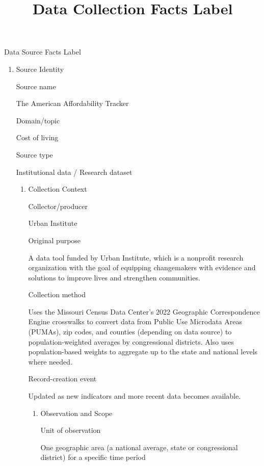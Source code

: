 \documentclass[
  letterpaper,
  DIV=11,
  numbers=noendperiod]{scrartcl}
\title{Data Collection Facts Label}
\author{}
\date{}
\providecommand{\tightlist}{%
  \setlength{\itemsep}{0pt}\setlength{\parskip}{0pt}}
\begin{document}
\maketitle


Data Source Facts Label

\begin{enumerate}
\def\labelenumi{\arabic{enumi}.}
\tightlist
\item
  Source Identity

  Source name

  The American Affordability Tracker

  Domain/topic

  Cost of living

  Source type

  Institutional data / Research dataset

  \begin{enumerate}
  \def\labelenumii{\arabic{enumii}.}
  \setcounter{enumii}{1}
  \tightlist
  \item
    Collection Context

    Collector/producer

    Urban Institute

    Original purpose

    A data tool funded by Urban Institute, which is a nonprofit research
    organization with the goal of equipping changemakers with evidence
    and solutions to improve lives and strengthen communities.

    Collection method

    Uses the Missouri Census Data Center's 2022 Geographic
    Correspondence Engine crosswalks to convert data from Public Use
    Microdata Areas (PUMAs), zip codes, and counties (depending on data
    source) to population-weighted averages by congressional districts.
    Also uses population-based weights to aggregate up to the state and
    national levels where needed.

    Record-creation event

    Updated as new indicators and more recent data becomes available.

    \begin{enumerate}
    \def\labelenumiii{\arabic{enumiii}.}
    \setcounter{enumiii}{2}
    \tightlist
    \item
      Observation and Scope

      Unit of observation

      One geographic area (a national average, state or congressional
      district) for a specific time period


\end{enumerate}
\end{enumerate}
\end{enumerate}
\end{document}
